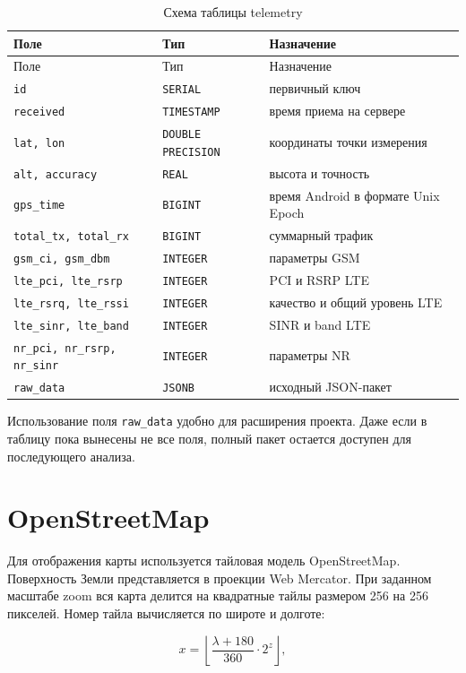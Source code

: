 \documentclass[14pt,a4paper]{extarticle}
\begin{document}
\begin{longtable}{p{}p{}p{}}
\caption{Схема таблицы telemetry}\\
\toprule
Поле & Тип & Назначение \\
\midrule
\endfirsthead
\toprule
Поле & Тип & Назначение \\
\midrule
\endhead
\texttt{id} & \texttt{SERIAL} & первичный ключ \\
\texttt{received} & \texttt{TIMESTAMP} & время приема на сервере \\
\texttt{lat, lon} & \texttt{DOUBLE PRECISION} & координаты точки измерения \\
\texttt{alt, accuracy} & \texttt{REAL} & высота и точность \\
\texttt{gps\_time} & \texttt{BIGINT} & время Android в формате Unix Epoch \\
\texttt{total\_tx, total\_rx} & \texttt{BIGINT} & суммарный трафик \\
\texttt{gsm\_ci, gsm\_dbm} & \texttt{INTEGER} & параметры GSM \\
\texttt{lte\_pci, lte\_rsrp} & \texttt{INTEGER} & PCI и RSRP LTE \\
\texttt{lte\_rsrq, lte\_rssi} & \texttt{INTEGER} & качество и общий уровень LTE \\
\texttt{lte\_sinr, lte\_band} & \texttt{INTEGER} & SINR и band LTE \\
\texttt{nr\_pci, nr\_rsrp, nr\_sinr} & \texttt{INTEGER} & параметры NR \\
\texttt{raw\_data} & \texttt{JSONB} & исходный JSON-пакет \\
\bottomrule
\end{longtable}

Использование поля \texttt{raw\_data} удобно для расширения проекта. Даже если в таблицу пока вынесены не все поля, полный пакет остается доступен для последующего анализа.

\section{OpenStreetMap}

Для отображения карты используется тайловая модель OpenStreetMap. Поверхность Земли представляется в проекции Web Mercator. При заданном масштабе zoom вся карта делится на квадратные тайлы размером 256 на 256 пикселей. Номер тайла вычисляется по широте и долготе:

\[
x = \left\lfloor \frac{\lambda + 180}{360} \cdot 2^z \right\rfloor,
\]
\end{document}
